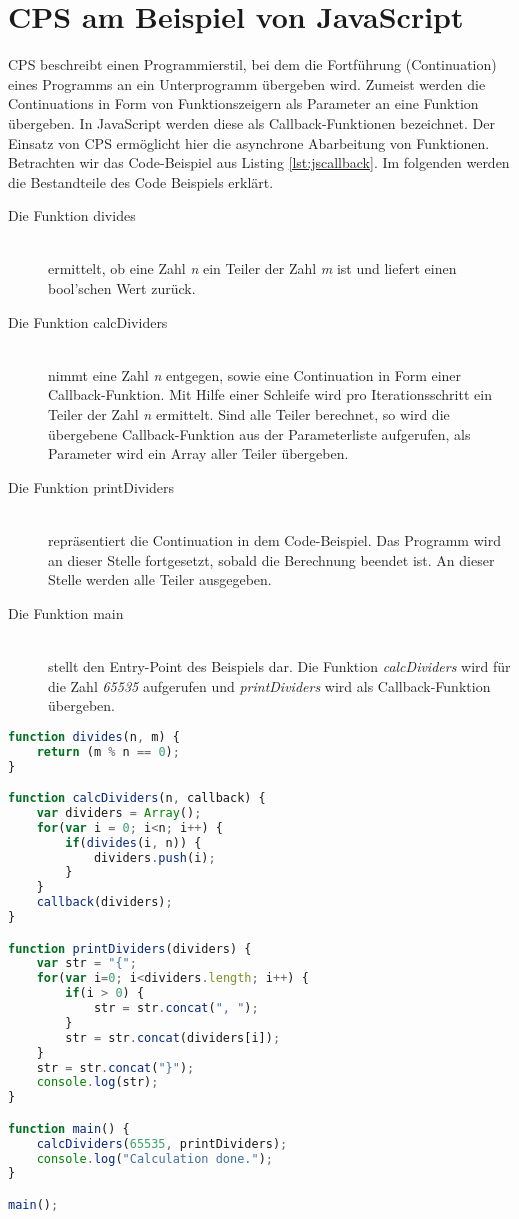 \section{\acl{CPS} am Beispiel von JavaScript}
\label{sec:jscps}\acl{CPS} beschreibt einen Programmierstil, bei dem die Fortführung (Continuation) eines Programms an ein Unterprogramm übergeben wird. Zumeist werden die Continuations in Form von Funktionszeigern als Parameter an eine Funktion übergeben. In JavaScript werden diese als Callback-Funktionen bezeichnet. Der Einsatz von \acs{CPS} ermöglicht hier die asynchrone Abarbeitung von Funktionen. Betrachten wir das Code-Beispiel aus Listing \ref{lst:jscallback}. Im folgenden werden die Bestandteile des Code Beispiels erklärt.
\begin{description}
\item[Die Funktion divides]\hfill \\
ermittelt, ob eine Zahl \textit{n} ein Teiler der Zahl \textit{m} ist und liefert einen bool'schen Wert zurück.
\item[Die Funktion calcDividers]\hfill \\
nimmt eine Zahl \textit{n} entgegen, sowie eine Continuation in Form einer Callback-Funktion. Mit Hilfe einer Schleife wird pro Iterationsschritt ein Teiler der Zahl \textit{n} ermittelt. Sind alle Teiler berechnet, so wird die übergebene Callback-Funktion aus der Parameterliste aufgerufen, als Parameter wird ein Array aller Teiler übergeben.
\item[Die Funktion printDividers] \hfill \\
repräsentiert die Continuation in dem Code-Beispiel. Das Programm wird an dieser Stelle fortgesetzt, sobald die Berechnung beendet ist. An dieser Stelle werden alle Teiler ausgegeben.
\item[Die Funktion main]\hfill \\
stellt den Entry-Point des Beispiels dar. Die Funktion \textit{calcDividers} wird für die Zahl \textit{65535} aufgerufen und \textit{printDividers} wird als Callback-Funktion übergeben.\\
\end{description}
\begin{lstlisting}[language=JavaScript,caption=JavaScript Callback Beispiel,label=lst:jscallback]
function divides(n, m) {
	return (m % n == 0);
}

function calcDividers(n, callback) {
	var dividers = Array();
	for(var i = 0; i<n; i++) {
		if(divides(i, n)) {
			dividers.push(i);
		}
	}
	callback(dividers);	
}

function printDividers(dividers) {
	var str = "{";
	for(var i=0; i<dividers.length; i++) {
		if(i > 0) {
			str = str.concat(", ");
		}
		str = str.concat(dividers[i]);
	}
	str = str.concat("}");
	console.log(str);
}

function main() {
	calcDividers(65535, printDividers);
	console.log("Calculation done.");
}

main();
\end{lstlisting}
